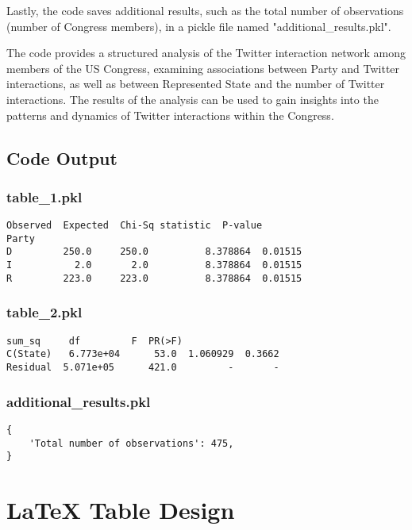 \documentclass[11pt]{article}
\begin{document}
Lastly, the code saves additional results, such as the total number of observations (number of Congress members), in a pickle file named "additional\_results.pkl".

The code provides a structured analysis of the Twitter interaction network among members of the US Congress, examining associations between Party and Twitter interactions, as well as between Represented State and the number of Twitter interactions. The results of the analysis can be used to gain insights into the patterns and dynamics of Twitter interactions within the Congress.

\subsection{Code Output}

\subsubsection*{table\_1.pkl}

\begin{Verbatim}[tabsize=4]
       Observed  Expected  Chi-Sq statistic  P-value
Party
D         250.0     250.0          8.378864  0.01515
I           2.0       2.0          8.378864  0.01515
R         223.0     223.0          8.378864  0.01515
\end{Verbatim}

\subsubsection*{table\_2.pkl}

\begin{Verbatim}[tabsize=4]
                 sum_sq     df         F  PR(>F)
C(State)   6.773e+04      53.0  1.060929  0.3662
Residual  5.071e+05      421.0         -       -
\end{Verbatim}

\subsubsection*{additional\_results.pkl}

\begin{Verbatim}[tabsize=4]
{
    'Total number of observations': 475,
}
\end{Verbatim}

\section{LaTeX Table Design}
\end{document}
